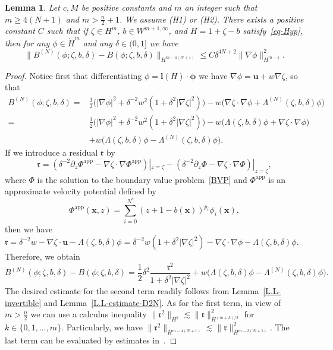 \documentclass[11pt,leqno]{article}
\newtheorem{lemma}[theorem]{\bf Lemma}
\numberwithin{equation}{section}
\numberwithin{figure}{section}
\begin{document}
\begin{lemma}\label{L.L-estimate-Bernoulli}
Let $c, M$ be positive constants and $m$ an integer such that $m\geq4(N+1)$ and $m>\frac{n}{2}+1$. 
We assume {\rm (H1)} or {\rm (H2)}. 
There exists a positive constant $C$ such that if $\zeta\in H^m$, $b\in W^{m+1,\infty}$, and $H=1+\zeta-b$ satisfy~\eqref{eq-Hyp}, 
then for any $\phi\in\mathring{H}^m$ and any $\delta\in(0,1]$ we have 
%
\[
\|B^{(N)}(\phi;\zeta,b,\delta)-B(\phi;\zeta,b,\delta)\|_{H^{m-4(N+1)}}
 \leq C \delta^{4N+2} \|\nabla \phi\|_{H^{m-1}}^2.
\]
\end{lemma}


\begin{proof}
Notice first that differentiating $\phi=\bm{l}(H)\cdot\bm{\phi}$ we have 
$\nabla \phi={\bm u}+ w\nabla\zeta$, so that 
%
\begin{align*}
B^{(N)}(\phi;\zeta,b,\delta)
=& \frac12\bigl( |\nabla\phi|^2 + \delta^{-2} w^2(1+\delta^2|\nabla\zeta|^2) \bigr)
  - w\bigl(\nabla\zeta\cdot\nabla\phi + \Lambda^{(N)}(\zeta,b,\delta)\phi\bigr) \\
=& \frac12\bigl( |\nabla\phi|^2 + \delta^{-2} w^2(1+\delta^2|\nabla\zeta|^2) \bigr)
  - w\bigl(\Lambda(\zeta,b,\delta)\phi+\nabla\zeta\cdot\nabla\phi\bigr) \\
 & + w\bigl( \Lambda(\zeta,b,\delta)\phi-\Lambda^{(N)}(\zeta,b,\delta)\phi \bigr).
\end{align*}
%
If we introduce a residual $\mathfrak{r}$ by 
%
\[
\mathfrak{r} = (\delta^{-2}\partial_z\Phi^\mathrm{app} - \nabla\zeta\cdot\nabla \Phi^\mathrm{app})|_{z=\zeta}
 - (\delta^{-2}\partial_z\Phi - \nabla\zeta\cdot\nabla \Phi)|_{z=\zeta},
\]
%
where $\Phi$ is the solution to the boundary value problem~\eqref{BVP} and $\Phi^\mathrm{app}$ 
is an approximate velocity potential defined by 
%
\begin{equation*}\label{AVP}
\Phi^\mathrm{app}(\bm{x},z) = \sum_{i=0}^{N^*}(z+1-b(\bm{x}))^{p_i}\phi_i(\bm{x}),
\end{equation*}	
%
then we have 
$\mathfrak{r}=\delta^{-2}w-\nabla\zeta\cdot \bm{u}-\Lambda(\zeta,b,\delta)\phi
=\delta^{-2} w(1+\delta^2|\nabla\zeta|^2)-\nabla\zeta\cdot\nabla\phi-\Lambda(\zeta,b,\delta)\phi$. 
Therefore, we obtain 
%
\[
B^{(N)}(\phi;\zeta,b,\delta) - B(\phi;\zeta,b,\delta)
= \frac12\delta^2\frac{\mathfrak{r}^2}{1+\delta^2|\nabla\zeta|^2}
 + w\bigl( \Lambda(\zeta,b,\delta)\phi-\Lambda^{(N)}(\zeta,b,\delta)\phi \bigr).
\]
%
The desired estimate for the second term readily follows from Lemma~\ref{L.L-invertible} and Lemma~\ref{L.L-estimate-D2N}. 
As for the first term, in view of $m>\frac{n}{2}$ we can use a calculus inequality 
$\|\mathfrak{r}^2\|_{H^k} \lesssim \|\mathfrak{r}\|_{H^{(m+k)/2}}^2$ for $k\in\{0,1,\dots,m\}$. 
Particularly, we have $\|\mathfrak{r}^2\|_{H^{m-4(N+1)}} \lesssim \|\mathfrak{r}\|_{H^{m-2(N+1)}}^2$. 
The last term can be evaluated by estimates in~\cite[Sections 8.1 and 8.2]{Iguchi2018-2}. 
\end{proof}
\end{document}
